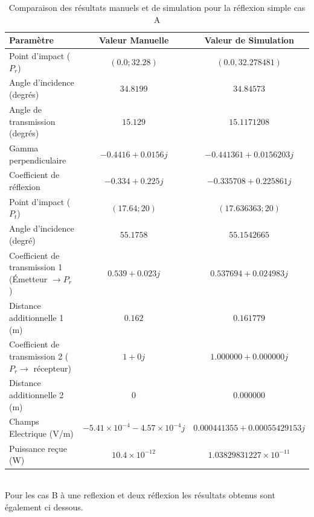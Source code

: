 \begin{table}[htbp]
\centering
\caption{Comparaison des résultats manuels et de simulation pour la réflexion simple cas A}
\label{tab:comparaison_reflection}
\begin{tabular}{@{}lcc@{}}
\toprule
\textbf{Paramètre} & \textbf{Valeur Manuelle} & \textbf{Valeur de Simulation} \\ \midrule
Point d'impact ($P_r$) & $(0.0; 32.28)$ & $(0.0, 32.278481)$ \\
Angle d'incidence (degrés) & $34.8199$ & $34.84573$ \\
Angle de transmission (degrés) & $15.129$ & $15.1171208$ \\
Gamma perpendiculaire &$-0.4416+0.0156j$&$-0.441361+0.0156203j$\\
Coefficient de réflexion & $-0.334+0.225j$ & $-0.335708 + 0.225861j$ \\
Point d'impact ($P_t$) & $(17.64; 20)$ & $(17.636363;20)$ \\
Angle d'incidence (degré) & $55.1758$ & $55.1542665$ \\
Coefficient de transmission 1 (Émetteur $\rightarrow P_r$) & $0.539+0.023j$ & $0.537694 + 0.024983j$ \\
Distance additionnelle 1 (m) & $0.162$ & $0.161779$ \\
Coefficient de transmission 2 ($P_r \rightarrow$ récepteur) & $1+0j$ & $1.000000 + 0.000000j$ \\
Distance additionnelle 2 (m) & $0$ & $0.000000$ \\
Champs Electrique (V/m) & $-5.41\times 10^{-4}-4.57\times 10^{-4}j$ & $0.000441355+0.00055429153j $\\
Puissance reçue (W) &  $10.4 \times 10^{-12}$& $1.03829831227 \times 10^{-11}$ \\
\bottomrule
\end{tabular}
\end{table}\\
Pour les cas B à une reflexion et deux réflexion les résultats obtenus sont également ci dessous.\\
